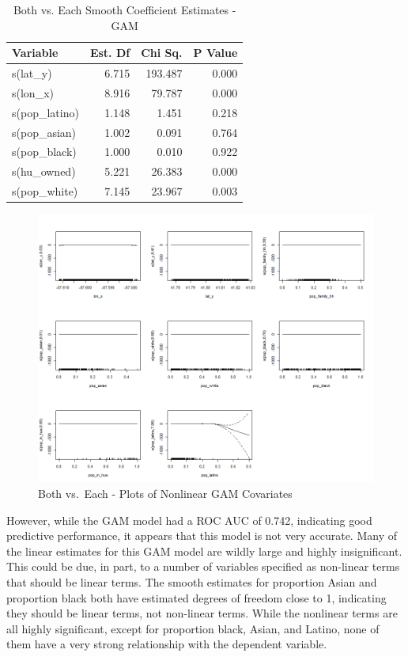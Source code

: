 \documentclass{ucetd}
\begin{document}
\begin{table}

\caption{\label{tab:both-gam}Both vs. Each Smooth Coefficient Estimates - GAM}
\centering
\begin{tabular}[t]{l|r|r|r}
\hline
Variable & Est. Df & Chi Sq. & P Value\\
\hline
s(lat\_y) & 6.715 & 193.487 & 0.000\\
\hline
s(lon\_x) & 8.916 & 79.787 & 0.000\\
\hline
s(pop\_latino) & 1.148 & 1.451 & 0.218\\
\hline
s(pop\_asian) & 1.002 & 0.091 & 0.764\\
\hline
s(pop\_black) & 1.000 & 0.010 & 0.922\\
\hline
s(hu\_owned) & 5.221 & 26.383 & 0.000\\
\hline
s(pop\_white) & 7.145 & 23.967 & 0.003\\
\hline
\end{tabular}
\end{table}

\begin{figure}
\centering
\includegraphics[width=1\textwidth,height=\textheight]{..//Modeling/modeling_files/figure-gfm/gam-both-1.png}
\caption{Both vs.~Each - Plots of Nonlinear GAM Covariates}
\end{figure}

However, while the GAM model had a ROC AUC of 0.742, indicating good
predictive performance, it appears that this model is not very accurate.
Many of the linear estimates for this GAM model are wildly large and
highly insignificant. This could be due, in part, to a number of
variables specified as non-linear terms that should be linear terms. The
smooth estimates for proportion Asian and proportion black both have
estimated degrees of freedom close to 1, indicating they should be
linear terms, not non-linear terms. While the nonlinear terms are all
highly significant, except for proportion black, Asian, and Latino, none
of them have a very strong relationship with the dependent variable.
\end{document}
